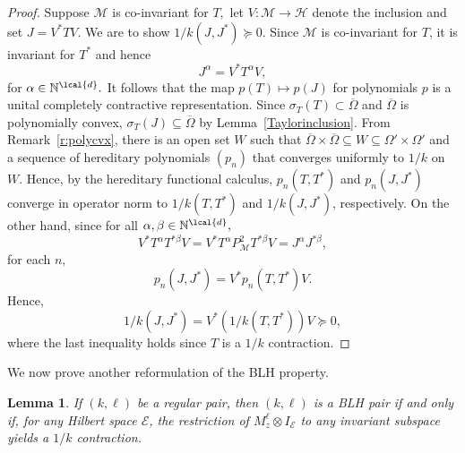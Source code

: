 \documentclass[a4paper,reqno,index]{amsart}
\numberwithin{equation}{section}
\newtheorem{lemma}[theorem]{Lemma}
\newcommand{\cM}{\mathcal{M}}
\newcommand{\HSH}{\mathcal{H}}
\newcommand{\specT}{\sigma_T}  %
\newcommand{\ol}[1]{\overline{#1}}
\theoremstyle{definition}
\begin{document}
\begin{proof}
Suppose $\cM$ is co-invariant for $T,$ let $V:\cM\to \HSH$ denote the inclusion
and set $J=V^*T V$. We are to show $1/k(J,J^*)\succeq 0.$
Since $\mathcal{M}$ is co-invariant for $T$, it is invariant for $T^*$ and hence 
\[
   J^{\alpha}=V^* T^{\alpha} V,
\]
 for $\alpha\in\mathbb{N}^{\lcal{d}}.$ 
 It follows that the map $p(T) \mapsto p(J)$ for polynomials $p$ is a unital completely contractive
 representation. Since $\specT(T)\subset \overline{\Omega}$ and $\ol{\Omega}$ is polynomially convex, $\specT(J)\subseteq \ol{\Omega}$
 by Lemma~\ref{Taylorinclusion}. From Remark~\ref{r:polycvx}, 
 there is an open set $W$ such that 
  $\ol{\Omega}\times \ol{\Omega} \subseteq W \subseteq \Omega'\times\Omega'$ and a
   sequence of hereditary polynomials $(p_n)$ that converges uniformly to $1/k$ on 
   $W.$  Hence, by the hereditary functional calculus,
   $p_n(T,T^*)$  and $p_n(J,J^*)$ converge in operator norm to $1/k(T,T^*)$ and $1/k(J,J^*)$, 
   respectively. On the other hand,
   since for all $\alpha, \beta\in\mathbb{N}^{\lcal{d}},$ 
\begin{equation*} V^* T^{\alpha}T^{*\beta} V =V^* T^{\alpha}P^2_{\mathcal{M}}T^{*\beta}V =J^{\alpha}J^{*{\beta}},
\end{equation*}
 for each $n,$
 \[
  p_n(J,J^*) =   V^* p_n(T,T^*) V.
 \]
 Hence,
\[
 1/k(J,J^*) = V^*( 1/k(T,T^*) ) V\succeq 0,
\]
 where the last inequality holds since $T$ is a $1/k$ contraction.
\end{proof}







We now prove another reformulation of the BLH property. 
 \begin{lemma}\label{recastBLH}
If  $(k, \ell)$ be a  regular pair, then  $(k, \ell)$ is a BLH pair if and only if, for any Hilbert space $\mathcal{E}$, the restriction of $M^{\ell}_z\otimes I_{\mathcal{E}}$ to any invariant subspace yields a $1/k$ contraction. 
 \end{lemma}
\end{document}
